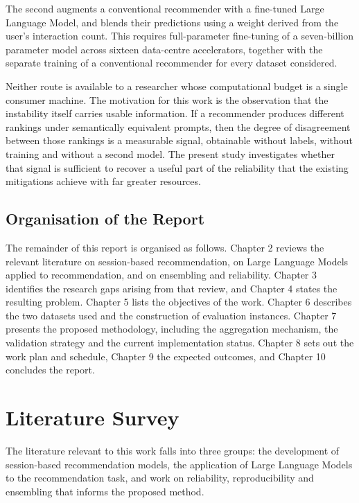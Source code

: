 \documentclass[12pt,a4paper,oneside]{report}
\begin{document}
The second augments a conventional recommender with a fine-tuned Large Language
Model, and blends their predictions using a weight derived from the user's
interaction count. This requires full-parameter fine-tuning of a seven-billion
parameter model across sixteen data-centre accelerators, together with the
separate training of a conventional recommender for every dataset considered.

Neither route is available to a researcher whose computational budget is a
single consumer machine. The motivation for this work is the observation that
the instability itself carries usable information. If a recommender produces
different rankings under semantically equivalent prompts, then the degree of
disagreement between those rankings is a measurable signal, obtainable without
labels, without training and without a second model. The present study
investigates whether that signal is sufficient to recover a useful part of the
reliability that the existing mitigations achieve with far greater resources.

\section{Organisation of the Report}

The remainder of this report is organised as follows. Chapter 2 reviews the
relevant literature on session-based recommendation, on Large Language Models
applied to recommendation, and on ensembling and reliability. Chapter 3
identifies the research gaps arising from that review, and Chapter 4 states the
resulting problem. Chapter 5 lists the objectives of the work. Chapter 6
describes the two datasets used and the construction of evaluation instances.
Chapter 7 presents the proposed methodology, including the aggregation
mechanism, the validation strategy and the current implementation status.
Chapter 8 sets out the work plan and schedule, Chapter 9 the expected outcomes,
and Chapter 10 concludes the report.

\chapter{Literature Survey}

The literature relevant to this work falls into three groups: the development of
session-based recommendation models, the application of Large Language Models to
the recommendation task, and work on reliability, reproducibility and ensembling
that informs the proposed method.
\end{document}
